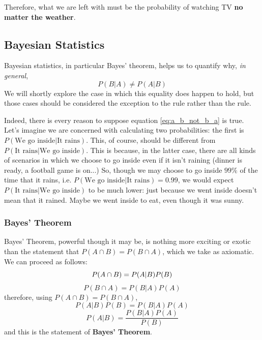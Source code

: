 \documentclass[]{article}
\begin{document}
Therefore, what we are left with must be the probability of watching TV \textbf{no matter the weather}.

\subsection{Bayesian Statistics}

Bayesian statistics, in particular Bayes' theorem, helps us to quantify why, \textit{in general},
\begin{equation}\label{eq:a_b_not_b_a}
    P(B|A) \ne P(A|B)
\end{equation}
We will shortly explore the case in which this equality does happen to hold, but those cases should be considered the exception to the rule rather than the rule.

Indeed, there is every reason to suppose equation \ref{eq:a_b_not_b_a} is true. Let's imagine we are concerned with calculating two probabilities: the first is $P(\text{We go inside} | \text{It rains})$. This, of course, should be different from $P(\text{It rains}|\text{We go inside})$. This is because, in the latter case, there are all kinds of scenarios in which we choose to go inside even if it isn't raining (dinner is ready, a football game is on...) So, though we may choose to go inside $99\%$ of the time that it rains, i.e. $P(\text{We go inside}|\text{It rains}) = 0.99$, we would expect $P(\text{It rains}|\text{We go inside})$ to be much lower: just because we went inside doesn't mean that it rained. Maybe we went inside to eat, even though it was sunny.

\subsubsection{Bayes' Theorem}

Bayes' Theorem, powerful though it may be, is nothing more exciting or exotic than the statement that $P(A \cap B) = P(B \cap A)$, which we take as axiomatic. We can proceed as follows:
\begin{equation}
    P(A \cap B) = P(A|B)P(B)\\
\end{equation}
\begin{equation}
    P(B \cap A) = P(B|A)P(A)
\end{equation}
therefore, using $P(A \cap B) = P(B \cap A)$,
\begin{equation}
    P(A|B)P(B) = P(B|A)P(A)
\end{equation}
\begin{equation}\label{eqn:bayes_theorem}
    P(A|B) = \frac{P(B|A)P(A)}{P(B)}
\end{equation}
and this is the statement of \textbf{Bayes' Theorem}.
\end{document}

